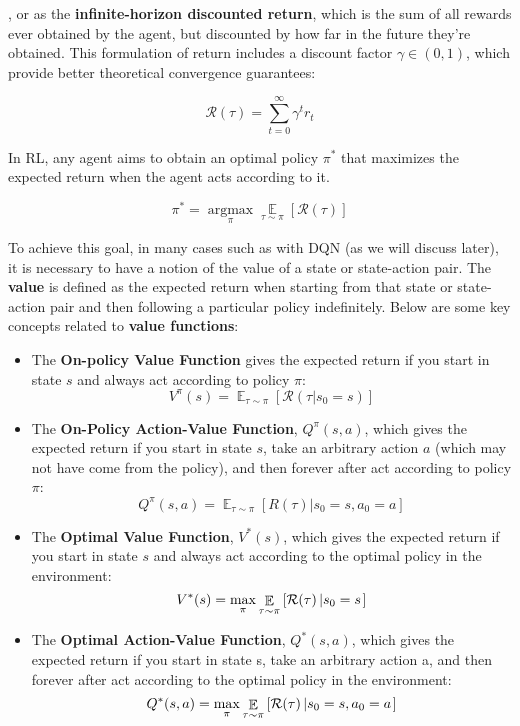 , or as the \textbf{infinite-horizon discounted return}, which is the sum of all rewards ever obtained by the agent, but discounted by how far in the future they’re obtained. This formulation of return includes a discount factor $\gamma \in (0,1)$, which provide better theoretical convergence guarantees:

$$\mathcal{R}(\tau) = \sum_{t=0}^\infty \gamma^t r_t$$

In RL, any agent aims to obtain an optimal policy $\pi^\ast$ that maximizes the expected return when the agent acts according to it.

\begin{equation}
    \pi^\ast = \operatorname*{arg max}_\pi \mathop{\mathbb{E}}\limits_{\tau \sim \pi}\left[\mathcal{R}(\tau) \right]
\label{eq:rl_objective}
\end{equation}

To achieve this goal, in many cases such as with DQN (as we will discuss later), it is necessary to have a notion of the value of a state or state-action pair. The \textbf{value} is defined as the expected return when starting from that state or state-action pair and then following a particular policy indefinitely. Below are some key concepts related to \textbf{value functions}:

\begin{itemize}
    \item The \textbf{On-policy Value Function} gives the expected return if you start in state $s$ and always act according to policy $\pi$:
    \begin{equation}
    V^\pi(s) = \mathop{\mathbb E}_{\tau \sim \pi} \left[\mathcal{R}(\tau | s_0 = s)\right]
    \end{equation}
    \item The \textbf{On-Policy Action-Value Function}, $Q^{\pi}(s,a)$, which gives the expected return if you start in state $s$, take an arbitrary action $a$ (which may not have come from the policy), and then forever after act according to policy $\pi$:
    \begin{equation}
    Q^{\pi}(s,a) = \mathop{\mathbb E}_{\tau \sim \pi}\left[R(\tau)\left| s_0 = s, a_0 = a\right.\right]
    \end{equation}
    \item The \textbf{Optimal Value Function}, $V^*(s)$, which gives the expected return if you start in state $s$ and always act according to the optimal policy in the environment:
    \begin{equation}
    V^*(s) = \max_{\pi} \mathop{\mathbb{E}}\limits_{\tau \sim \pi}\left[\mathcal{R}(\tau)\left| s_0 = s\right.\right]
    \end{equation}
    \item The \textbf{Optimal Action-Value Function}, $Q^*(s,a)$, which gives the expected return if you start in state s, take an arbitrary action a, and then forever after act according to the optimal policy in the environment:
    \begin{equation}
        Q^*(s,a) = \max_{\pi} \mathop{\mathbb{E}}\limits_{\tau \sim \pi}\left[\mathcal{R}(\tau)\left| s_0 = s, a_0 = a\right.\right]
        \label{eq:q_optimal_value}
    \end{equation}


\end{itemize}


